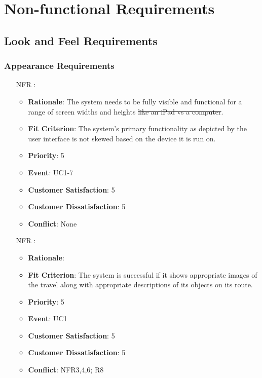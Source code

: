 \documentclass[12pt, titlepage]{article}
\newcounter{reqnum} %
\newcounter{freqnum} %
\begin{document}
\section{Non-functional Requirements}

\subsection{Look and Feel Requirements}


\subsubsection{Appearance Requirements}
\begin{itemize}
\item[NFR\refstepcounter{freqnum}\thefreqnum
\label{NFR}:] 
\begin{itemize}
    \item \textbf{Rationale}: The system needs to be fully visible and functional for a range of screen widths and heights\sout{ like an iPad vs a computer}.
    \item \textbf{Fit Criterion}: The system's primary functionality as depicted by the user interface is not skewed based on the device it is run on.
    \item \textbf{Priority}: 5
    \item \textbf{Event}: UC1-7 %
    \item \textbf{Customer Satisfaction}: 5
    \item \textbf{Customer Dissatisfaction}: 5
    \item \textbf{Conflict}: None
\end{itemize}
\item[NFR\refstepcounter{freqnum}\thefreqnum
\label{NFR}:] 
\begin{itemize}
    \item \textbf{Rationale}:
    \item \textbf{Fit Criterion}: The system is successful if it shows appropriate images of the travel along with appropriate descriptions of its objects on its route.
    \item \textbf{Priority}: 5
    \item \textbf{Event}: UC1 %
    \item \textbf{Customer Satisfaction}: 5
    \item \textbf{Customer Dissatisfaction}: 5
    \item \textbf{Conflict}: NFR3,4,6; R8
\end{itemize}


\end{itemize}
\end{document}
